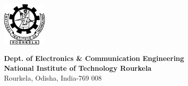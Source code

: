 \begin{titlepage}


\par

\vspace{3.2in}
\vspace{3.2in}
\\

%

\begin{minipage}{.1\linewidth}
	\hspace*{-.6cm}\includegraphics[height=2.2cm]{logo}
\end{minipage}
\hspace{.2cm}
\begin{minipage}{.9\linewidth}
	{\large
		{\textbf{Dept. of Electronics \& Communication Engineering}\\
			\textbf{National Institute of Technology Rourkela\\}}}
	{\large
		{Rourkela, Odisha, India-769 008}}
	
\end{minipage}

\end{titlepage}
